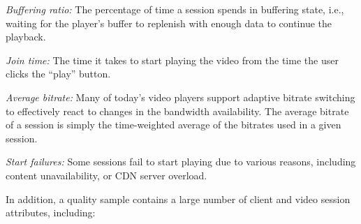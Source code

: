 \begin{packedenumerate}
\item \emph{Buffering ratio:} The percentage of time a session spends
  in buffering state, i.e., waiting for the player's buffer to
  replenish with enough data to continue the playback.
\item \emph{Join time:} The time it takes to start playing the video
  from the time the user clicks the ``play'' button.
\item \emph{Average bitrate:} Many of today's video players support
  adaptive bitrate switching to effectively react to changes in the
  bandwidth availability. The average bitrate of a session is simply
  the time-weighted average of the bitrates used in a given session.
\item \emph{Start failures:} Some sessions fail to start playing due
  to various reasons, including content unavailability, or CDN server
  overload.
\end{packedenumerate}


In addition, a quality sample contains a large number of client and
video session attributes, including:


